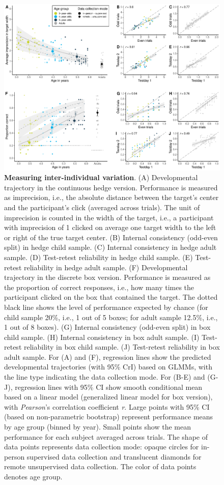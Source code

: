 \documentclass[
  man,floatsintext]{apa7}
\begin{document}
\begin{figure}

{\centering \includegraphics[width=1\linewidth]{../figures/tango_arrangedplot} 

}

\caption{\textbf{Measuring inter-individual variation}. (A) Developmental trajectory in the continuous hedge version. Performance is measured as imprecision, i.e., the absolute distance between the target's center and the participant's click (averaged across trials). The unit of imprecision is counted in the width of the target, i.e., a participant with imprecision of 1 clicked on average one target width to the left or right of the true target center. (B) Internal consistency (odd-even split) in hedge child sample. (C) Internal consistency in hedge adult sample. (D) Test-retest reliability in hedge child sample. (E) Test-retest reliability in hedge adult sample. (F) Developmental trajectory in the discrete box version. Performance is measured as the proportion of correct responses, i.e., how many times the participant clicked on the box that contained the target. The dotted black line shows the level of performance expected by chance (for child sample 20\%, i.e., 1 out of 5 boxes; for adult sample 12.5\%, i.e., 1 out of 8 boxes). (G) Internal consistency (odd-even split) in box child sample. (H) Internal consistency in box adult sample. (I) Test-retest reliability in box child sample. (J) Test-retest reliability in box adult sample. For (A) and (F), regression lines show the predicted developmental trajectories (with 95\% CrI) based on GLMMs, with the line type indicating the data collection mode. For (B-E) and (G-J), regression lines with 95\% CI show smooth conditional mean based on a linear model (generalized linear model for box version), with \emph{Pearson}'s correlation coefficient \emph{r}. Large points with 95\% CI (based on non-parametric bootstrap) represent performance means by age group (binned by year). Small points show the mean performance for each subject averaged across trials. The shape of data points represents data collection mode: opaque circles for in-person supervised data collection and translucent diamonds for remote unsupervised data collection. The color of data points denotes age group.}\label{fig:fig2}
\end{figure}
\end{document}
